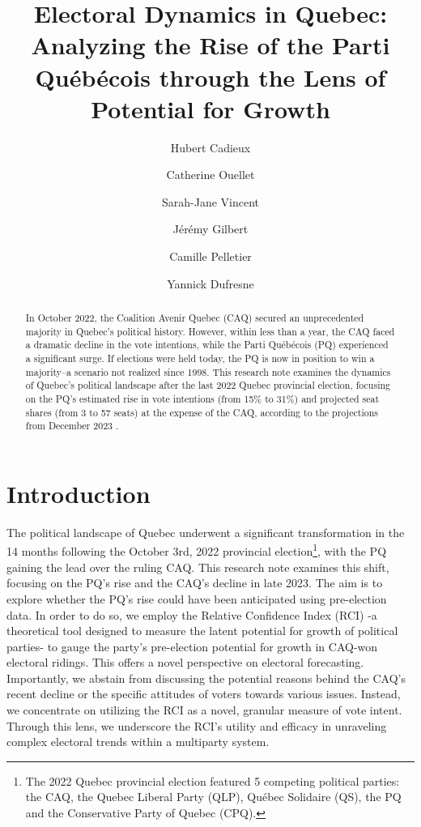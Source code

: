 \documentclass[
  journal=medium,
  manuscript=article-type,
  year=2024
]{cup-journal}
\title{Electoral Dynamics in Quebec: Analyzing the Rise of the Parti Québécois through the Lens of Potential for Growth}
\author{Hubert Cadieux}
\affiliation{Université Laval}
\author{Catherine Ouellet}
\affiliation{Université de Montréal}
\author{Sarah-Jane Vincent}
\affiliation{Université Laval}
\author{Jérémy Gilbert}
\affiliation{Université Laval}
\author{Camille Pelletier}
\affiliation{Université Laval}
\author{Yannick Dufresne}
\affiliation{Université Laval}
\begin{document}
\begin{abstract}

In October 2022, the Coalition Avenir Quebec (CAQ) secured an unprecedented majority in Quebec's political history. However, within less than a year, the CAQ faced a dramatic decline in the vote intentions, while the Parti Québécois (PQ) experienced a significant surge. If elections were held today, the PQ is now in position to win a majority--a scenario not realized since 1998. This research note examines the dynamics of Quebec's political landscape after the last 2022 Quebec provincial election, focusing on the PQ's estimated rise in vote intentions (from 15\% to 31\%) and projected seat shares (from 3 to 57 seats) at the expense of the CAQ, according to the projections from December 2023 \autocite{Qc12523}. %
\end{abstract}

\section{Introduction}

The political landscape of Quebec underwent a significant transformation in the 14 months following the October 3rd, 2022 provincial election\footnote{The 2022 Quebec provincial election featured 5 competing political parties: the CAQ, the Quebec Liberal Party (QLP), Québec Solidaire (QS), the PQ and the Conservative Party of Quebec (CPQ).}, with the PQ gaining the lead over the ruling CAQ. This research note examines this shift, focusing on the PQ's rise and the CAQ's decline in late 2023. The aim is to explore whether the PQ's rise could have been anticipated using pre-election data. In order to do so, we employ the Relative Confidence Index (RCI) -a theoretical tool designed to measure the latent potential for growth of political parties- to gauge the party's pre-election potential for growth in CAQ-won electoral ridings. This offers a novel perspective on electoral forecasting. Importantly, we abstain from discussing the potential reasons behind the CAQ's recent decline or the specific attitudes of voters towards various issues. Instead, we concentrate on utilizing the RCI as a novel, granular measure of vote intent. Through this lens, we underscore the RCI's utility and efficacy in unraveling complex electoral trends within a multiparty system.
\end{document}

